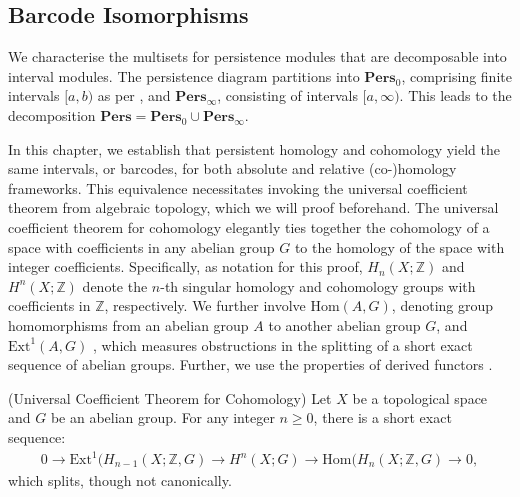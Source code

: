 \subsection{Barcode Isomorphisms}
We characterise the multisets for persistence modules that are decomposable into
interval modules. The persistence diagram partitions into $\textbf{Pers}_{0}$,
comprising finite intervals $[a, b)$ as per \cite[§2.3]{de2011dualities}, and $\textbf
{Pers}_{\infty}$, consisting of intervals $[a, \infty)$. This leads to the decomposition
$\textbf{Pers}= \textbf{Pers}_{0} \cup \textbf{Pers}_{\infty}$.

In this chapter, we establish that persistent homology and cohomology yield the
same intervals, or barcodes, for both absolute and relative (co-)homology
frameworks. This equivalence necessitates invoking the universal coefficient theorem
from algebraic topology, which we will proof beforehand. The universal coefficient
theorem for cohomology elegantly ties together the cohomology of a space with coefficients
in any abelian group $G$ to the homology of the space with integer coefficients.
Specifically, as notation for this proof, $H_{n}(X;\mathbb{Z})$ and
$H^{n}(X;\mathbb{Z})$ denote the $n$-th singular homology and cohomology groups
with coefficients in $\mathbb{Z}$, respectively. We further involve
$\text{Hom}(A, G)$, denoting group homomorphisms from an abelian group $A$ to another
abelian group $G$, and $\text{Ext}^{1}(A, G)$ \cite{}, which measures obstructions
in the splitting of a short exact sequence of abelian groups. Further, we use the
properties of derived functors \cite{}.

\begin{theorem}
	{(Universal Coefficient Theorem for Cohomology) \cite[§3.1]{hatcher2005algebraic}}
	\label{universalcoefficients} Let $X$ be a topological space and $G$ be an abelian
	group. For any integer $n \geq 0$, there is a short exact sequence:
	\begin{align*}
		0 \rightarrow \text{Ext}^{1}(H_{n-1}(X;\mathbb{Z},G) \rightarrow H^{n}(X;G) \rightarrow \text{Hom}(H_{n}(X;\mathbb{Z},G) \rightarrow 0,
	\end{align*}
	which splits, though not canonically.
\end{theorem}


